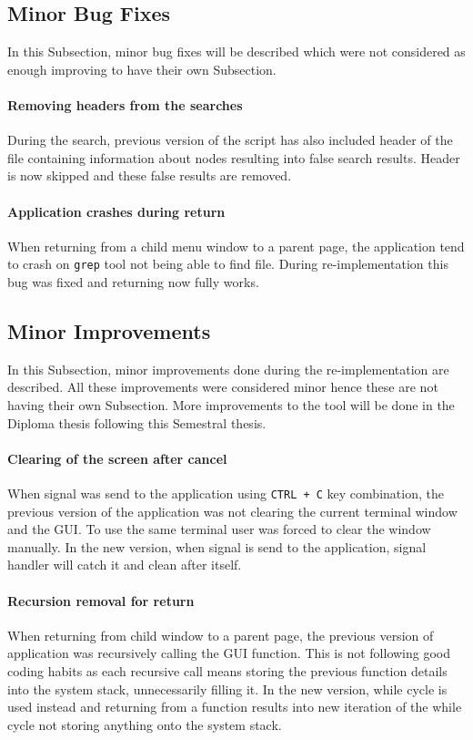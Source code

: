 \subsection{Minor Bug Fixes}
In this Subsection, minor bug fixes will be described which were not considered as enough improving to have their own Subsection. 
\paragraph{Removing headers from the searches}
During the search, previous version of the script has also included header of the file containing information about nodes resulting into false search results. Header is now skipped and these false results are removed.
\paragraph{Application crashes during return}
When returning from a child menu window to a parent page, the application tend to crash on \texttt{grep} tool not being able to find file. During re-implementation this bug was fixed and returning now fully works.
\subsection{Minor Improvements}
In this Subsection, minor improvements done during the re-implementation are described. All these improvements were considered minor hence these are not having their own Subsection. More improvements to the tool will be done in the Diploma thesis following this Semestral thesis.
\paragraph{Clearing of the screen after cancel}
When signal was send to the application using \texttt{CTRL + C} key combination, the previous version of the application was not clearing the current terminal window and the GUI. To use the same terminal user was forced to clear the window manually. In the new version, when signal is send to the application, signal handler will catch it and clean after itself.
\paragraph{Recursion removal for return}
When returning from child window to a parent page, the previous version of application was recursively calling the GUI function. This is not following good coding habits as each recursive call means storing the previous function details into the system stack, unnecessarily filling it. In the new version, while cycle is used instead and returning from a function results into new iteration of the while cycle not storing anything onto the system stack. 
